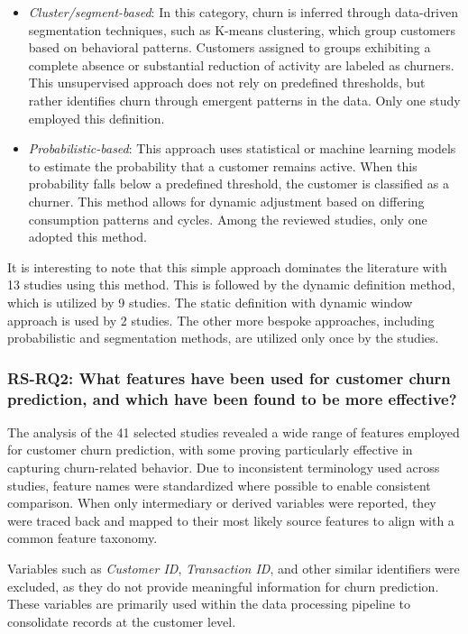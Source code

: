 \documentclass[preprint,12pt]{elsarticle}
\newcommand{\RSRQtwo}{RS-RQ2: What features have been used for customer churn prediction, and which have been found to be more effective?}
\begin{document}
\begin{itemize}
    \item \textit{Cluster/segment-based}: In this category, churn is inferred through data-driven segmentation techniques, such as K-means clustering, which group customers based on behavioral patterns. Customers assigned to groups exhibiting a complete absence or substantial reduction of activity are labeled as churners. This unsupervised approach does not rely on predefined thresholds, but rather identifies churn through emergent patterns in the data. Only one study employed this definition.
     
    \item \textit{Probabilistic-based}: This approach uses statistical or machine learning models to estimate the probability that a customer remains active. When this probability falls below a predefined threshold, the customer is classified as a churner. This method allows for dynamic adjustment based on differing consumption patterns and cycles. Among the reviewed studies, only one adopted this method.

\end{itemize}



It is interesting to note that this simple approach dominates the literature with 13 studies using this method. This is followed by the dynamic definition method, which is utilized by 9 studies. The static definition with dynamic window approach is used by 2 studies. The other more bespoke approaches, including probabilistic and segmentation methods, are utilized only once by the studies.

\subsubsection{\RSRQtwo}
The analysis of the 41 selected studies revealed a wide range of features employed for customer churn prediction,  with some proving particularly effective in capturing churn-related behavior. Due to inconsistent terminology used across studies, feature names were standardized where possible to enable consistent comparison. When only intermediary or derived variables were reported, they were traced back and mapped to their most likely source features to align with a common feature taxonomy.

Variables such as \textit{Customer ID}, \textit{Transaction ID}, and other similar identifiers were excluded, as they do not provide meaningful information for churn prediction. These variables are primarily used within the data processing pipeline to consolidate records at the customer level.
\end{document}
